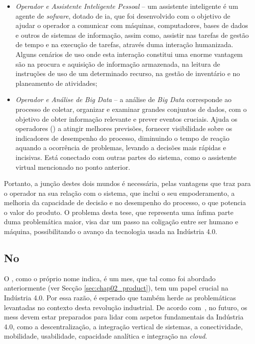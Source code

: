 \begin{itemize}
    \item
    {
        \textit{Operador e Assistente Inteligente Pessoal} -- um assistente inteligente é um agente de \textit{sofware}, dotado de \gls{ia}, que foi desenvolvido com o objetivo de ajudar o operador a comunicar com máquinas, computadores, bases de dados e outros de sistemas de informação, assim como, assistir nas tarefas de gestão de tempo e na execução de tarefas, através duma interação humanizada. Alguns cenários de uso onde esta interação constitui uma enorme vantagem são na procura e aquisição de informação armazenada, na leitura de instruções de uso de um determinado recurso, na gestão de inventário e no planeamento de atividades;
    }
    \item
    {
        \textit{Operador e Análise de Big Data} -- a análise de \textit{Big Data} corresponde ao processo de coletar, organizar e examinar grandes conjuntos de dados, com o objetivo de obter informação relevante e prever eventos cruciais. Ajuda os operadores () a atingir melhores previsões, fornecer visibilidade sobre os indicadores de desempenho do processo, diminuindo o tempo de reação aquando a ocorrência de problemas, levando a decisões mais rápidas e incisivas. Está conectado com outras partes do sistema, como o assistente virtual mencionado no ponto anterior.
    }
\end{itemize}

Portanto, a junção destes dois mundos é necessária, pelas vantagens que traz para o operador na sua relação com o sistema, que inclui o seu empoderamento, a melhoria da capacidade de decisão e no desempenho do processo, o que potencia o valor do produto. O problema desta tese, que representa uma ínfima parte duma problemática maior, visa dar um passo na coligação entre ser humano e máquina, possibilitando o avanço da tecnologia usada na Indústria 4.0.

\subsection{No {\productname}}
O {\productname}, como o próprio nome indica, é um \gls{mes}, que tal como foi abordado anteriormente (ver Secção \ref{sec:chap02_product}), tem um papel crucial na Indústria 4.0. Por essa razão, é esperado que também herde as problemáticas levantadas no contexto desta revolução industrial. De acordo com~\textcite{industry40_revolution_future_mes}, no futuro, os \glspl{mes} devem estar preparados para lidar com aspetos fundamentais da Indústria 4.0, como a descentralização, a integração vertical de sistemas, a conectividade, mobilidade, usabilidade, capacidade analítica e integração na \textit{cloud}. 

